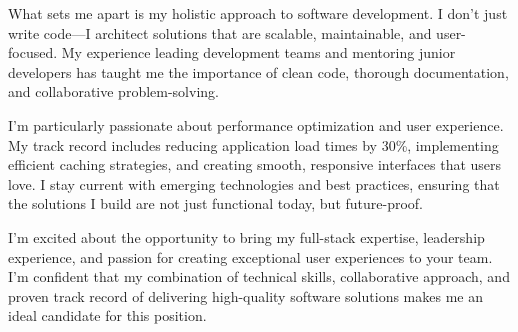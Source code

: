 \documentclass[11pt, a4paper]{awesome-cv}
\begin{document}
\begin{cvletter}
What sets me apart is my holistic approach to software development. I don't just write code—I architect solutions that are scalable, maintainable, and user-focused. My experience leading development teams and mentoring junior developers has taught me the importance of clean code, thorough documentation, and collaborative problem-solving.

I'm particularly passionate about performance optimization and user experience. My track record includes reducing application load times by 30\%, implementing efficient caching strategies, and creating smooth, responsive interfaces that users love. I stay current with emerging technologies and best practices, ensuring that the solutions I build are not just functional today, but future-proof.

I'm excited about the opportunity to bring my full-stack expertise, leadership experience, and passion for creating exceptional user experiences to your team. I'm confident that my combination of technical skills, collaborative approach, and proven track record of delivering high-quality software solutions makes me an ideal candidate for this position.

\end{cvletter}
\end{document}
